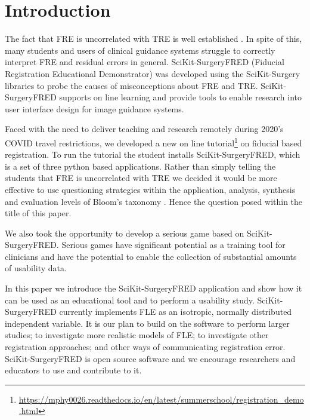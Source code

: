 \section{Introduction}
The fact that \gls{FRE} is uncorrelated with \gls{TRE} is well established 
\cite{fitzpatrick2009}. In spite of this, many students and users of clinical guidance systems struggle to 
correctly interpret \gls{FRE} and residual errors in general. 
SciKit-SurgeryFRED (Fiducial Registration Educational Demonstrator)
 \cite{stephen_thompson_2020_3946090} was developed using the 
SciKit-Surgery \cite{PMID:32436132} libraries to probe the causes of misconceptions 
about \gls{FRE} and \gls{TRE}. SciKit-SurgeryFRED supports on line learning and provide tools to enable 
research into user interface design for image guidance systems. 

Faced with the need to deliver teaching and research remotely during 2020's {COVID} travel restrictions, we 
developed a new on line tutorial\footnote{\url{https://mphy0026.readthedocs.io/en/latest/summerschool/registration_demo.html}}
on fiducial based registration. To run the tutorial the student installs SciKit-SurgeryFRED, which is a 
set of three python based applications. Rather than simply telling the students that \gls{FRE} is uncorrelated with \gls{TRE} 
we decided it would be more effective to use questioning strategies within the application, analysis, synthesis and 
evaluation levels of Bloom's taxonomy \cite{blooms_tax}. Hence the question posed within the title of this paper. 

We also took the opportunity to develop a serious game based on SciKit-SurgeryFRED. Serious games have significant potential 
as a training tool for clinicians \cite{PMID:28133947} and have the potential to enable the collection of substantial amounts of 
usability data. 

In this paper we introduce the SciKit-SurgeryFRED application and show how it can
be used as an educational tool and to perform a usability study. SciKit-SurgeryFRED 
currently implements \gls{FLE} as an isotropic, normally distributed independent variable. 
It is our plan to build on 
the software to perform larger studies; to investigate more realistic models of \gls{FLE};
to investigate other registration approaches; and other ways of communicating registration error. 
SciKit-SurgeryFRED is open 
source software and we encourage researchers and educators to use and contribute to it. 

